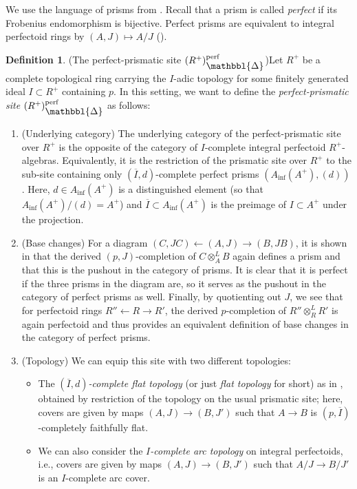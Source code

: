 \documentclass[10pt,twoside]{article}
\numberwithin{equation}{section}
\theoremstyle{plain}
\theoremstyle{definition}
\newtheorem{mydef}[mythm]{Definition}
\DeclareMathOperator{\perf}{perf}
\newcommand{\Prism}{{\mathlarger{\mathbbl{\Delta}}}}
\DeclareMathOperator{\Inf}{inf}
\newcommand{\Ainf}{A_{\Inf}}
\begin{document}
We use the language of prisms from \cite{BS21}. Recall that a prism is called \emph{perfect} if its Frobenius endomorphism is bijective. Perfect prisms are equivalent to integral perfectoid rings by \((A,J)\mapsto A/J\) (\cite[Theorem 3.10]{BS21}).

\begin{mydef}(The perfect-prismatic site \((R^+)_{\Prism}^{\perf}\))\label{defPrismaticSite}
Let \(R^+\) be a complete topological ring carrying the \(I\)-adic topology for some finitely generated ideal \(I\subset R^+\) containing \(p\). In this setting, we want to define the \emph{perfect-prismatic site} \((R^+)_{\Prism}^{\perf}\) as follows:
\begin{enumerate}
    \item (Underlying category) The underlying category of the perfect-prismatic site over \(R^+\) is the opposite of the category of \(I\)-complete integral perfectoid \(R^+\)-algebras. Equivalently, it is the restriction of the prismatic site over \(R^+\) to the sub-site containing only \((\overline I,d)\)-complete perfect prisms \((\Ainf(A^+),(d))\). Here, \(d\in \Ainf(A^+)\) is a distinguished element (so that \(\Ainf(A^+)/(d)=A^+\)) and \(\overline I\subset \Ainf(A^+)\) is the preimage of \(I\subset A^+\) under the projection.
    \item (Base changes) For a diagram \((C,JC)\leftarrow (A,J)\rightarrow (B,JB)\), it is shown in \cite[Corollary 3.12]{BS21} that the derived \((p,J)\)-completion of \(C\otimes_A^{L} B\) again defines a prism and that this is the pushout in the category of prisms. It is clear that it is perfect if the three prisms in the diagram are, so it serves as the pushout in the category of perfect prisms as well. Finally, by quotienting out \(J\), we see that for perfectoid rings \(R''\leftarrow R \rightarrow R'\), the derived \(p\)-completion of \(R''\otimes_R^{L} R'\) is again perfectoid and thus provides an equivalent definition of base changes in the category of perfect prisms.
    \item (Topology) We can equip this site with two different topologies:
\begin{itemize}
    \item The \emph{\((\overline I,d)\)-complete flat topology} (or just \emph{flat topology} for short) as in \cite[Definition 4.1]{BS21}, obtained by restriction of the topology on the usual prismatic site; here, covers are given by maps \((A,J)\to (B,J')\) such that \(A\to B\) is \((p,\overline I)\)-completely faithfully flat. 
    \item We can also consider the \emph{\(I\)-complete arc topology} on integral perfectoids, i.e., covers are given by maps \((A,J)\to (B,J')\) such that \(A/J\to B/J'\) is an \(I\)-complete arc cover. 

\end{itemize}
\end{enumerate}
\end{mydef}
\end{document}
